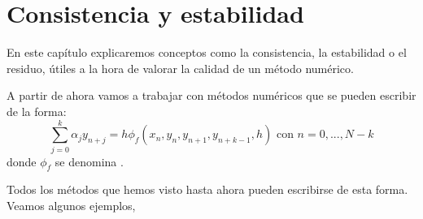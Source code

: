 \documentclass{apuntes}
\begin{document}
\chapter{Consistencia y estabilidad}

En este capítulo explicaremos conceptos como la consistencia, la estabilidad o el residuo, útiles a la hora de valorar la calidad de un método numérico.

A partir de ahora vamos a trabajar con métodos numéricos que se pueden escribir de la forma:
\[\sum_{j=0}^k α_jy_{n+j} = h \phi_f(x_n,y_n,y_{n+1},y_{n+k-1},h) \text{ con } n=0,...,N - k\]
donde $\phi_f$ se denomina .

\obs Todos los métodos que hemos visto hasta ahora pueden escribirse de esta forma. Veamos algunos ejemplos,
\end{document}
